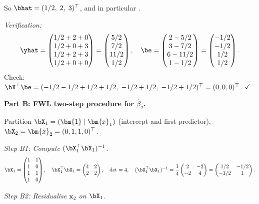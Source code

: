 \begin{example}
So $\bhat = (1/2,\; 2,\; 3)^\top$, and in particular .

\emph{Verification:}
\[
\yhat = \begin{pmatrix}1/2+2+0\\1/2+0+3\\1/2+2+3\\1/2+0+0\end{pmatrix}
= \begin{pmatrix}5/2\\7/2\\11/2\\1/2\end{pmatrix},\quad
\be = \begin{pmatrix}2-5/2\\3-7/2\\6-11/2\\1-1/2\end{pmatrix}
= \begin{pmatrix}-1/2\\-1/2\\1/2\\1/2\end{pmatrix}.
\]
Check: $\bX^\top\be = (-1/2-1/2+1/2+1/2,\;-1/2+1/2,\;-1/2+1/2)^\top = (0,0,0)^\top$. $\checkmark$

\medskip\noindent\textbf{Part B: FWL two-step procedure for $\hat\beta_2$.}

Partition $\bX_1 = (\bm{1}\mid \bm{x}_1)$ (intercept and first predictor),
$\bX_2 = \bm{x}_2 = (0,1,1,0)^\top$.

\emph{Step B1: Compute $(\bX_1^\top\bX_1)^{-1}$.}
\[
\bX_1 = \begin{pmatrix}1&1\\1&0\\1&1\\1&0\end{pmatrix},\quad
\bX_1^\top\bX_1 = \begin{pmatrix}4&2\\2&2\end{pmatrix},\quad
\det=4,\quad
(\bX_1^\top\bX_1)^{-1} = \frac{1}{4}\begin{pmatrix}2&-2\\-2&4\end{pmatrix}
= \begin{pmatrix}1/2&-1/2\\-1/2&1\end{pmatrix}.
\]

\emph{Step B2: Residualise $\bm{x}_2$ on $\bX_1$.}


\end{example}
